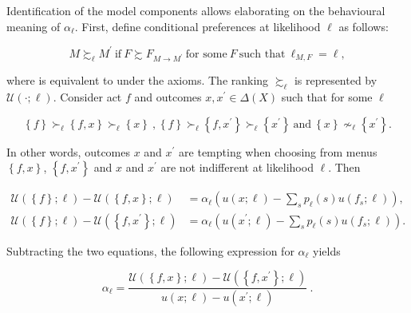 Identification of the model components allows elaborating on the behavioural meaning of \( \alpha_{\ell} \). First, define conditional preferences at likelihood \( \ell \) as follows:

\[
	M \succsim_{\ell} M^{\prime} \: \text{if} \: F \succsim F_{M \rightarrow M^{\prime}} \: \text{for some} \: F \: \text{such that} \: \ell_{M,F} = \ell,
\]

where  is equivalent to  under the axioms. The ranking \( \succsim_{\ell} \) is represented by \( \mathcal{U} \left( \cdot ; \ell \right) \). Consider act \( f \) and outcomes \(x, x^{\prime} \in \Delta \left( X \right) \) such that for some \( \ell \)

\[
	\left\{f \right\} \succ_{\ell} \left\{f, x \right\} \succ_{\ell} \left\{ x \right\} \: \text{,} \: \left\{f \right\} \succ_{\ell} \left\{f, x^{\prime} \right\} \succ_{\ell} \left\{ x^{\prime} \right\} \: \text{and} \:  \left\{ x \right\} \nsim_{\ell} \left\{ x^{\prime} \right\} .
\]

In other words, outcomes \( x \) and \( x^{\prime} \) are tempting when choosing from menus \( \left\{ f, x \right\} \),  \( \left\{ f, x^{\prime} \right\} \) and \( x \) and \( x^{\prime} \) are not indifferent at likelihood \( \ell \). Then

\begin{align*}
	\mathcal{U} \left( \left\{f \right\}; \ell \right) - \mathcal{U} \left( \left\{f, x \right\}; \ell \right)            & = \alpha_{\ell} \left( u\left(x ; \ell \right) - \sum_{s} p_{\ell} \left( s \right) u\left(f_{s} ; \ell \right) \right)     ,      \\
	\mathcal{U} \left( \left\{f \right\} ; \ell \right) - \mathcal{U} \left( \left\{f, x^{\prime} \right\} ; \ell \right) & = \alpha_{\ell} \left( u\left(x^{\prime} ; \ell \right) - \sum_{s} p_{\ell} \left( s \right) u\left(f_{s} ; \ell \right) \right) .
\end{align*}

Subtracting the two equations, the following expression for \( \alpha_{\ell} \) yields

\[
	\alpha_{\ell} = \frac{\mathcal{U} \left( \left\{f, x \right\} ; \ell \right) - \mathcal{U} \left( \left\{f, x^{\prime} \right\} ; \ell \right) }{u \left( x ; \ell \right) - u \left( x^{\prime} ; \ell \right)} \: .
\]

